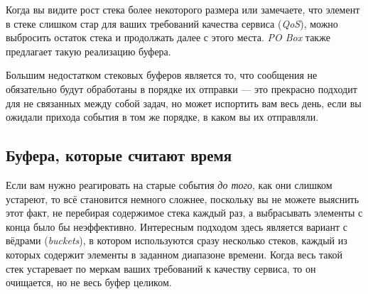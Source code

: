 \documentclass[11pt, oneside]{book}   	%
\begin{document}

Когда вы видите рост стека более некоторого размера или замечаете, что элемент в стеке слишком стар для ваших требований качества сервиса (\emph{QoS}), можно выбросить остаток стека и продолжать далее с этого места. \emph{PO Box} также предлагает такую реализацию буфера.

Большим недостатком стековых буферов является то, что сообщения не обязательно будут обработаны в порядке их отправки --- это прекрасно подходит для не связанных между собой задач, но может испортить вам весь день, если вы ожидали прихода события в том же порядке, в каком вы их отправляли.


\subsection{Буфера, которые считают время}

Если вам нужно реагировать на старые события \emph{до того}, как они слишком устареют, то всё становится немного сложнее, поскольку вы не можете выяснить этот факт, не перебирая содержимое стека каждый раз, а выбрасывать элементы с конца было бы неэффективно. Интересным подходом здесь является вариант с вёдрами (\emph{buckets}), в котором используются сразу несколько стеков, каждый из которых содержит элементы в заданном диапазоне времени. Когда весь такой стек устаревает по меркам ваших требований к качеству сервиса, то он очищается, но не весь буфер целиком.
\end{document}
